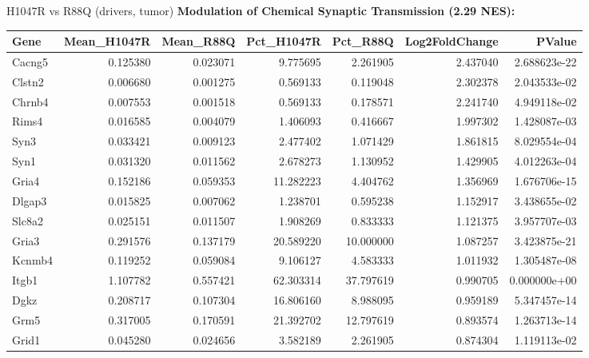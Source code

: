 \documentclass[10pt, aspectratio=169]{beamer}
\begin{document}
\begin{frame}{H1047R vs R88Q (drivers, tumor)}
  \centering
  {\small \textbf{Modulation of Chemical Synaptic Transmission (2.29 NES):}}\par
  \vspace{0.15cm}
  \tiny
  \begin{tabular}{l r r r r r r}
    \toprule
    \textbf{Gene} & \textbf{Mean\_H1047R} & \textbf{Mean\_R88Q} & \textbf{Pct\_H1047R} & \textbf{Pct\_R88Q} & \textbf{Log2FoldChange} & \textbf{PValue} \\
    \midrule
    Cacng5 & 0.125380 & 0.023071 & 9.775695 & 2.261905 & 2.437040 & 2.688623e-22 \\
    Clstn2 & 0.006680 & 0.001275 & 0.569133 & 0.119048 & 2.302378 & 2.043533e-02 \\
    Chrnb4 & 0.007553 & 0.001518 & 0.569133 & 0.178571 & 2.241740 & 4.949118e-02 \\
    Rims4 & 0.016585 & 0.004079 & 1.406093 & 0.416667 & 1.997302 & 1.428087e-03 \\
    Syn3 & 0.033421 & 0.009123 & 2.477402 & 1.071429 & 1.861815 & 8.029554e-04 \\
    Syn1 & 0.031320 & 0.011562 & 2.678273 & 1.130952 & 1.429905 & 4.012263e-04 \\
    Gria4 & 0.152186 & 0.059353 & 11.282223 & 4.404762 & 1.356969 & 1.676706e-15 \\
    Dlgap3 & 0.015825 & 0.007062 & 1.238701 & 0.595238 & 1.152917 & 3.438655e-02 \\
    Slc8a2 & 0.025151 & 0.011507 & 1.908269 & 0.833333 & 1.121375 & 3.957707e-03 \\
    Gria3 & 0.291576 & 0.137179 & 20.589220 & 10.000000 & 1.087257 & 3.423875e-21 \\
    Kcnmb4 & 0.119252 & 0.059084 & 9.106127 & 4.583333 & 1.011932 & 1.305487e-08 \\
    Itgb1 & 1.107782 & 0.557421 & 62.303314 & 37.797619 & 0.990705 & 0.000000e+00 \\
    Dgkz & 0.208717 & 0.107304 & 16.806160 & 8.988095 & 0.959189 & 5.347457e-14 \\
    Grm5 & 0.317005 & 0.170591 & 21.392702 & 12.797619 & 0.893574 & 1.263713e-14 \\
    Grid1 & 0.045280 & 0.024656 & 3.582189 & 2.261905 & 0.874304 & 1.119113e-02 \\

\end{tabular}
\end{frame}
\end{document}
